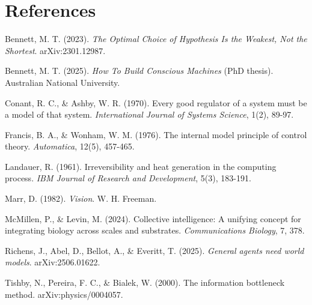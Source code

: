 \documentclass[11pt]{article}
\begin{document}
\section*{References}


Bennett, M. T. (2023). \textit{The Optimal Choice of Hypothesis Is the Weakest, Not the Shortest}. arXiv:2301.12987.

Bennett, M. T. (2025). \textit{How To Build Conscious Machines} (PhD thesis). Australian National University.

Conant, R. C., \& Ashby, W. R. (1970). Every good regulator of a system must be a model of that system. \textit{International Journal of Systems Science}, 1(2), 89-97.

Francis, B. A., \& Wonham, W. M. (1976). The internal model principle of control theory. \textit{Automatica}, 12(5), 457-465.

Landauer, R. (1961). Irreversibility and heat generation in the computing process. \textit{IBM Journal of Research and Development}, 5(3), 183-191.

Marr, D. (1982). \textit{Vision}. W. H. Freeman.

McMillen, P., \& Levin, M. (2024). Collective intelligence: A unifying concept for integrating biology across scales and substrates. \textit{Communications Biology}, 7, 378.

Richens, J., Abel, D., Bellot, A., \& Everitt, T. (2025). \textit{General agents need world models}. arXiv:2506.01622.

Tishby, N., Pereira, F. C., \& Bialek, W. (2000). The information bottleneck method. arXiv:physics/0004057.
\end{document}
